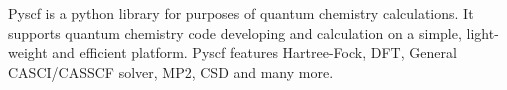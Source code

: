 Pyscf is a python library for purposes of quantum chemistry calculations. It supports quantum chemistry code developing and calculation on a simple, light-weight and efficient platform. Pyscf features Hartree-Fock, DFT, General CASCI/CASSCF solver, MP2, CSD and many more. 